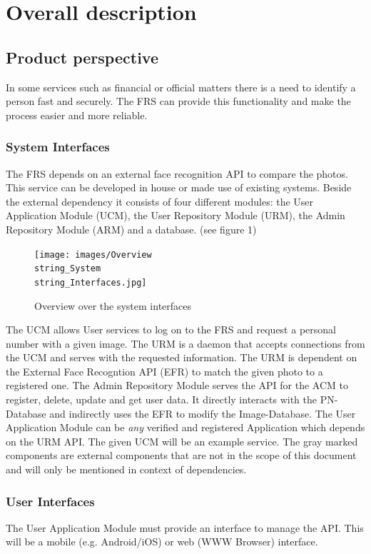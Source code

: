 \documentclass[a4paper,11pt]{article}
\begin{document}
\newpage
\section{Overall description}

\subsection{Product perspective}
In some services such as financial or official matters there is a need to identify a person fast and securely. The FRS can provide this functionality and make the process easier and more reliable.

\subsubsection{System Interfaces}
The FRS depends on an external face recognition API to compare the photos. This service can be developed in house or made use of existing systems. Beside the external dependency it consists of four different modules: the User Application Module (UCM), the User Repository Module (URM), the Admin Repository Module (ARM) and a database. (see figure 1)
\begin{figure}[h!]
	\centering
	\label{System Interfaces}
	\texttt{[image: images/Overview\\string\_System\\string\_Interfaces.jpg]}
	\caption{Overview over the system interfaces}
\end{figure}
\newpage
\noindent
The UCM allows User services to log on to the FRS and request a personal number with a given image. The URM is a daemon that accepts connections from the UCM and serves with the requested information. The URM is dependent on the External Face Recogntion API (EFR) to match the given photo to a registered one. The Admin Repository Module serves the API for the ACM to register, delete, update and get user data. It directly interacts with the PN-Database and indirectly uses the EFR to modify the Image-Database.
\newline
\noindent
The User Application Module can be \textit{any} verified and registered Application which depends on the URM API. The given UCM will be an example service. The gray marked components are external components that are not in the scope of this document and will only be mentioned in context of dependencies.

\subsubsection{User Interfaces}
The User Application Module must provide an interface to manage the API. This will be a mobile (e.g. Android/iOS) or web (WWW Browser) interface.
\end{document}
